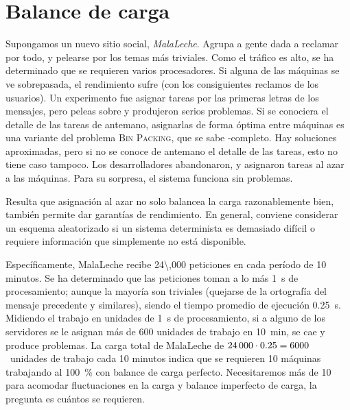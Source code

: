 \section{Balance de carga}
\label{sec:balance-de-carga}

  Supongamos un nuevo sitio social,
  \emph{MalaLeche}.
  Agrupa a gente dada a reclamar por todo,
  y pelearse por los temas más triviales.
  Como el tráfico es alto,
  se ha determinado que se requieren varios procesadores.
  Si alguna de las máquinas se ve sobrepasada,
  el rendimiento sufre
  (con los consiguientes reclamos de los usuarios).
  Un experimento fue asignar tareas por las primeras letras de los mensajes,
  pero peleas sobre 
  y  produjeron serios problemas.
  Si se conociera el detalle de las tareas de antemano,
  asignarlas de forma óptima entre máquinas
  es una variante del problema \textsc{Bin Packing},
  que se sabe \NP\nobreakdash-completo.
  Hay soluciones aproximadas,
  pero si no se conoce de antemano el detalle de las tareas,
  esto no tiene caso tampoco.
  Los desarrolladores abandonaron,
  y asignaron tareas al azar a las máquinas.
  Para su sorpresa,
  el sistema funciona sin problemas.

  Resulta que asignación al azar no solo balancea la carga razonablemente bien,
  también permite dar garantías de rendimiento.
  En general,
  conviene considerar un esquema aleatorizado
  si un sistema determinista es demasiado difícil
  o requiere información que simplemente no está disponible.

  Específicamente,
  MalaLeche recibe \num[group-digits = true]{24\,000} peticiones
  en cada período de \num[group-digits = true]{10} minutos.
  Se ha determinado que las peticiones
  toman a lo más \SI{1}{\second} de procesamiento;
  aunque la mayoría son triviales
  (quejarse de la ortografía del mensaje precedente
   y similares),
  siendo el tiempo promedio de ejecución \SI{0,25}{\second}.
  Midiendo el trabajo en unidades de \SI{1}{\second} de procesamiento,
  si a alguno de los servidores
  se le asignan más de \num[group-digits = true]{600} unidades de trabajo
  en \SI{10}{\minute},
  se cae y produce problemas.
  La carga total de MalaLeche
  de \(\num[group-digits = true]{24\,000}
           \cdot \num[group-digits = true]{0,25}
          = \num[group-digits = true]{6\,000}\)~unidades de trabajo
  cada \num[group-digits = true]{10} minutos
  indica que se requieren \num[group-digits = true]{10} máquinas
  trabajando al \SI{100}{\percent} con balance de carga perfecto.
  Necesitaremos más de \num[group-digits = true]{10}
  para acomodar fluctuaciones en la carga
  y balance imperfecto de carga,
  la pregunta es cuántos se requieren.

